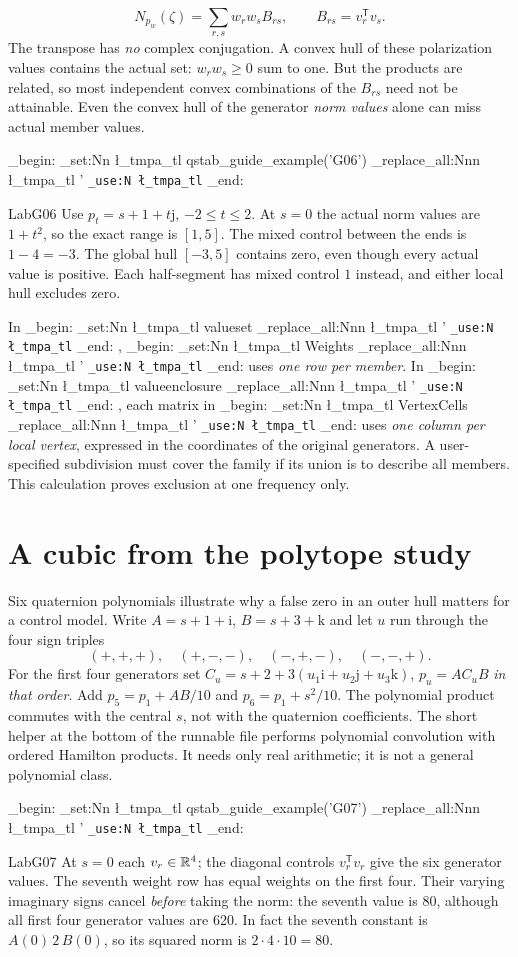 \documentclass[11pt,a4paper]{article}
\newcommand{\m}[1]{
  \group_begin:
  \tl_set:Nn \l_tmpa_tl {#1}
  \tl_replace_all:Nnn \l_tmpa_tl {'}{\textquotesingle{}}
  \texttt{\tl_use:N \l_tmpa_tl}
  \group_end:
}
\newcommand{\lead}[1]{\par\smallskip\noindent{\sffamily\bfseries\color{teal}#1}\enspace}
\newcommand{\unit}{\mathrm{i}}\newcommand{\qj}{\mathrm{j}}\newcommand{\qk}{\mathrm{k}}\newcommand{\ii}{\iota}
\newcommand{\topic}[2]{\clearpage\section{#1}\label{#2}}
\newcommand{\lab}[1]{\lead{Executable example #1}\m{qstab\_guide\_example('#1')}\par\csname Lab#1\endcsname}
\begin{document}
\[
 N_{p_w}(\zeta)=\sum_{r,s}w_rw_s B_{rs},\qquad B_{rs}=v_r^{\mathsf T}v_s.
\]
The transpose has \emph{no} complex conjugation. A convex hull of these polarization values contains the actual set: $w_rw_s\ge0$ sum to one. But the products are related, so most independent convex combinations of the $B_{rs}$ need not be attainable. Even the convex hull of the generator \emph{norm values} alone can miss actual member values.
\lab{G06}
Use $p_t=s+1+t\qj$, $-2\le t\le2$. At $s=0$ the actual norm values are $1+t^2$, so the exact range is $[1,5]$. The mixed control between the ends is $1-4=-3$. The global hull $[-3,5]$ contains zero, even though every actual value is positive. Each half-segment has mixed control $1$ instead, and either local hull excludes zero.
\begin{center}
\end{center}
In \m{valueset}, \m{Weights} uses \emph{one row per member}. In \m{valueenclosure}, each matrix in \m{VertexCells} uses \emph{one column per local vertex}, expressed in the coordinates of the original generators. A user-specified subdivision must cover the family if its union is to describe all members. This calculation proves exclusion at one frequency only.
\topic{A cubic from the polytope study}{sec:paper}
Six quaternion polynomials illustrate why a false zero in an outer hull matters for a control model. Write $A=s+1+\unit$, $B=s+3+\qk$ and let $u$ run through the four sign triples
\[
 (+,+,+),\quad(+,-,-),\quad(-,+,-),\quad(-,-,+).
\]
For the first four generators set $C_u=s+2+3(u_1\unit+u_2\qj+u_3\qk)$, $p_u=A C_u B$ \emph{in that order}. Add $p_5=p_1+AB/10$ and $p_6=p_1+s^2/10$. The polynomial product commutes with the central $s$, not with the quaternion coefficients. The short helper at the bottom of the runnable file performs polynomial convolution with ordered Hamilton products. It needs only real arithmetic; it is not a general polynomial class.
\lab{G07}
At $s=0$ each $v_r\in\mathbb R^4$; the diagonal controls $v_r^{\mathsf T}v_r$ give the six generator values. The seventh weight row has equal weights on the first four. Their varying imaginary signs cancel \emph{before} taking the norm: the seventh value is 80, although all first four generator values are 620. In fact the seventh constant is $A(0)\,2\,B(0)$, so its squared norm is $2\cdot4\cdot10=80$.
\end{document}
